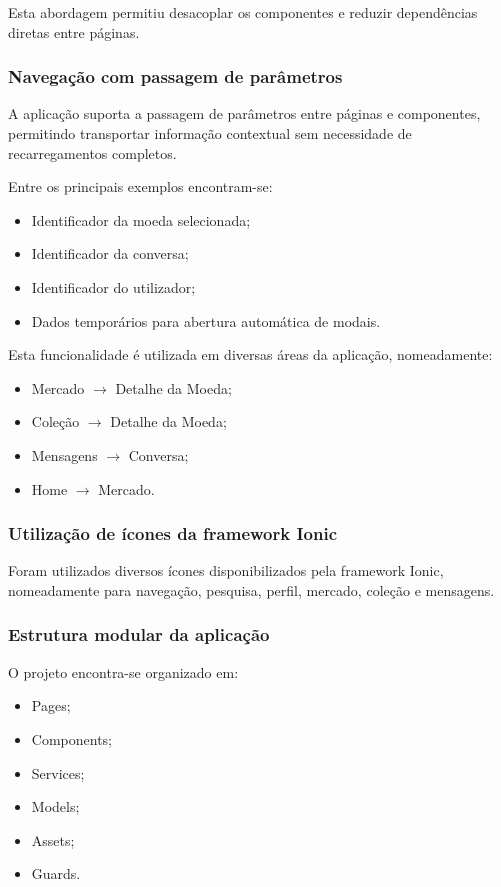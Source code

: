 \documentclass[12pt,a4paper]{article}
\begin{document}
Esta abordagem permitiu desacoplar os componentes e reduzir dependências diretas entre páginas.

\subsubsection{Navegação com passagem de parâmetros}

A aplicação suporta a passagem de parâmetros entre páginas e componentes, permitindo transportar informação contextual sem necessidade de recarregamentos completos.

Entre os principais exemplos encontram-se:

\begin{itemize}
\setlength{\itemsep}{0.15em}
\item Identificador da moeda selecionada;
\item Identificador da conversa;
\item Identificador do utilizador;
\item Dados temporários para abertura automática de modais.
\end{itemize}

Esta funcionalidade é utilizada em diversas áreas da aplicação, nomeadamente:

\begin{itemize}
\setlength{\itemsep}{0.15em}
\item Mercado $\rightarrow$ Detalhe da Moeda;
\item Coleção $\rightarrow$ Detalhe da Moeda;
\item Mensagens $\rightarrow$ Conversa;
\item Home $\rightarrow$ Mercado.
\end{itemize}

\subsubsection{Utilização de ícones da framework Ionic}

Foram utilizados diversos ícones disponibilizados pela framework Ionic, nomeadamente para navegação, pesquisa, perfil, mercado, coleção e mensagens.

\subsubsection{Estrutura modular da aplicação}

O projeto encontra-se organizado em:

\begin{itemize}
\setlength{\itemsep}{0.15em}
\item Pages;
\item Components;
\item Services;
\item Models;
\item Assets;
\item Guards.
\end{itemize}
\end{document}
